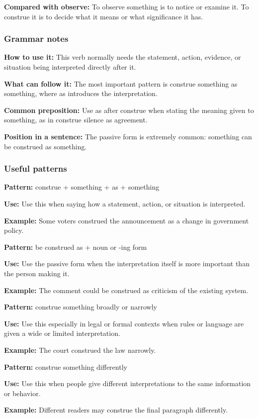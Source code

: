 \documentclass[11pt]{article}
\begin{document}
\textbf{Compared with observe:} To observe something is to notice or examine it. To construe it is to decide what it means or what significance it has.

\subsubsection{Grammar notes}
\textbf{How to use it:} This verb normally needs the statement, action, evidence, or situation being interpreted directly after it.

\textbf{What can follow it:} The most important pattern is construe something as something, where as introduces the interpretation.

\textbf{Common preposition:} Use as after construe when stating the meaning given to something, as in construe silence as agreement.

\textbf{Position in a sentence:} The passive form is extremely common: something can be construed as something.

\subsubsection{Useful patterns}
\textbf{Pattern:} construe + something + as + something

\textbf{Use:} Use this when saying how a statement, action, or situation is interpreted.

\textbf{Example:} Some voters construed the announcement as a change in government policy.

\textbf{Pattern:} be construed as + noun or -ing form

\textbf{Use:} Use the passive form when the interpretation itself is more important than the person making it.

\textbf{Example:} The comment could be construed as criticism of the existing system.

\textbf{Pattern:} construe something broadly or narrowly

\textbf{Use:} Use this especially in legal or formal contexts when rules or language are given a wide or limited interpretation.

\textbf{Example:} The court construed the law narrowly.

\textbf{Pattern:} construe something differently

\textbf{Use:} Use this when people give different interpretations to the same information or behavior.

\textbf{Example:} Different readers may construe the final paragraph differently.
\end{document}
